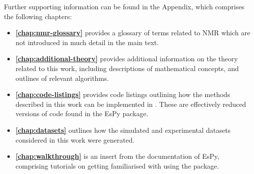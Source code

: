 Further supporting information can be found in the Appendix, which comprises
the following chapters:
\begin{itemize}
    \item \textbf{\cref{chap:nmr-glossary}} provides a glossary of terms
        related to \ac{NMR} which are not introduced in much detail in the main
        text.
    \item \textbf{\cref{chap:additional-theory}} provides additional
        information on the theory related to this work, including descriptions
        of mathematical concepts, and outlines of relevant algorithms.
    \item \textbf{\cref{chap:code-listings}} provides code listings outlining
        how the methods described in this work can be implemented in \Python.
        These are effectively reduced versions of code found in the \ac{EsPy}
        package.
    \item \textbf{\cref{chap:datasets}} outlines how the simulated and
        experimental datasets considered in this work were generated.
    \item \textbf{\cref{chap:walkthrough}} is an insert from the documentation
        of \ac{EsPy}, comprising tutorials on getting familiarised with using
        the package.
\end{itemize}
